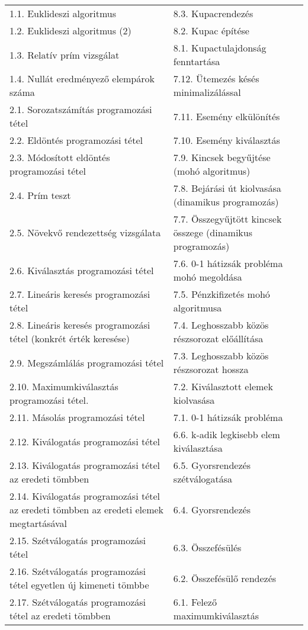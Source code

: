 \begin{tabularx}{\textwidth}{X X}
1.1. Euklideszi algoritmus & 8.3. Kupacrendezés \\
1.2. Euklideszi algoritmus (2) & 8.2. Kupac építése \\
1.3. Relatív prím vizsgálat & 8.1. Kupactulajdonság fenntartása \\
1.4. Nullát eredményező elempárok száma & 7.12. Ütemezés késés minimalizálással \\
2.1. Sorozatszámítás programozási tétel & 7.11. Esemény elkülönítés \\
2.2. Eldöntés programozási tétel & 7.10. Esemény kiválasztás \\
2.3. Módosított eldöntés programozási tétel & 7.9. Kincsek begyűjtése (mohó algoritmus) \\
2.4. Prím teszt & 7.8. Bejárási út kiolvasása (dinamikus programozás) \\
2.5. Növekvő rendezettség vizsgálata & 7.7. Összegyűjtött kincsek összege (dinamikus programozás) \\
2.6. Kiválasztás programozási tétel & 7.6. 0-1 hátizsák probléma mohó megoldása \\
2.7. Lineáris keresés programozási tétel & 7.5. Pénzkifizetés mohó algoritmusa \\
2.8. Lineáris keresés programozási tétel (konkrét érték keresése) & 7.4. Leghosszabb közös részsorozat előállítása \\
2.9. Megszámlálás programozási tétel & 7.3. Leghosszabb közös részsorozat hossza \\
2.10. Maximumkiválasztás programozási tétel. & 7.2. Kiválasztott elemek kiolvasása \\
2.11. Másolás programozási tétel & 7.1. 0-1 hátizsák probléma \\
2.12. Kiválogatás programozási tétel & 6.6. k-adik legkisebb elem kiválasztása \\
2.13. Kiválogatás programozási tétel az eredeti tömbben & 6.5. Gyorsrendezés szétválogatása \\
2.14. Kiválogatás programozási tétel az eredeti tömbben az eredeti elemek megtartásával & 6.4. Gyorsrendezés \\
2.15. Szétválogatás programozási tétel & 6.3. Összefésülés \\
2.16. Szétválogatás programozási tétel egyetlen új kimeneti tömbbe & 6.2. Összefésülő rendezés \\
2.17. Szétválogatás programozási tétel az eredeti tömbben & 6.1. Felező maximumkiválasztás \\

\end{tabularx}
